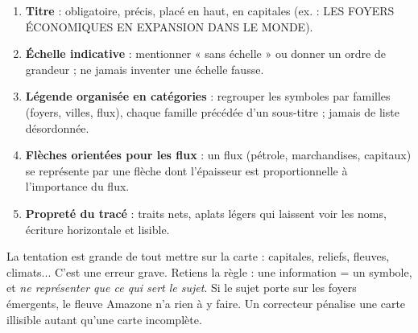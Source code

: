 \documentclass[11pt]{article}
\newcommand{\cle}[1]{{\popxbold\color{popdark}#1}}
\begin{document}
\begin{methode}
\begin{enumerate}
\item \textbf{Titre} : obligatoire, précis, placé en haut, en capitales (ex. : LES FOYERS ÉCONOMIQUES EN EXPANSION DANS LE MONDE).
\item \textbf{Échelle indicative} : mentionner « sans échelle » ou donner un ordre de grandeur ; ne jamais inventer une échelle fausse.
\item \textbf{Légende organisée en catégories} : regrouper les symboles par familles (foyers, villes, flux), chaque famille précédée d'un sous-titre ; jamais de liste désordonnée.
\item \textbf{Flèches orientées pour les flux} : un flux (pétrole, marchandises, capitaux) se représente par une flèche dont l'épaisseur est proportionnelle à l'importance du flux.
\item \textbf{Propreté du tracé} : traits nets, aplats légers qui laissent voir les noms, écriture horizontale et lisible.
\end{enumerate}
\end{methode}

\begin{attention}
La tentation est grande de tout mettre sur la carte : capitales, reliefs, fleuves, climats... C'est une erreur grave. Retiens la règle : \cle{une information = un symbole}, et \emph{ne représenter que ce qui sert le sujet}. Si le sujet porte sur les foyers émergents, le fleuve Amazone n'a rien à y faire. Un correcteur pénalise une carte illisible autant qu'une carte incomplète.
\end{attention}
\end{document}
